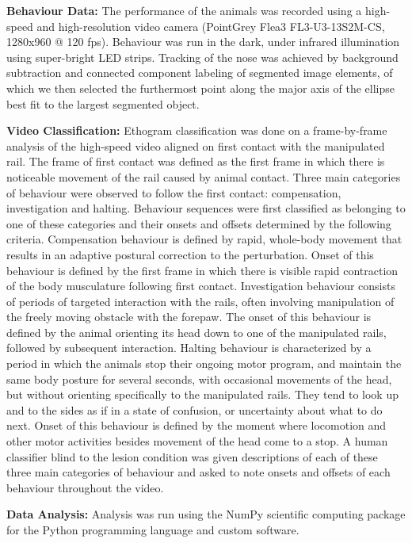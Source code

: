 \textbf{Behaviour Data:} The performance of the animals was recorded using a high-speed and high-resolution video camera (PointGrey Flea3 FL3-U3-13S2M-CS, 1280x960 @ 120 fps). Behaviour was run in the dark, under infrared illumination using super-bright LED strips. Tracking of the nose was achieved by background subtraction and connected component labeling of segmented image elements, of which we then selected the furthermost point along the major axis of the ellipse best fit to the largest segmented object.

\textbf{Video Classification:} Ethogram classification was done on a frame-by-frame analysis of the high-speed video aligned on first contact with the manipulated rail. The frame of first contact was defined as the first frame in which there is noticeable movement of the rail caused by animal contact. Three main categories of behaviour were observed to follow the first contact: compensation, investigation and halting. Behaviour sequences were first classified as belonging to one of these categories and their onsets and offsets determined by the following criteria. Compensation behaviour is defined by rapid, whole-body movement that results in an adaptive postural correction to the perturbation. Onset of this behaviour is defined by the first frame in which there is visible rapid contraction of the body musculature following first contact. Investigation behaviour consists of periods of targeted interaction with the rails, often involving manipulation of the freely moving obstacle with the forepaw. The onset of this behaviour is defined by the animal orienting its head down to one of the manipulated rails, followed by subsequent interaction. Halting behaviour is characterized by a period in which the animals stop their ongoing motor program, and maintain the same body posture for several seconds, with occasional movements of the head, but without orienting specifically to the manipulated rails. They tend to look up and to the sides as if in a state of confusion, or uncertainty about what to do next. Onset of this behaviour is defined by the moment where locomotion and other motor activities besides movement of the head come to a stop. A human classifier blind to the lesion condition was given descriptions of each of these three main categories of behaviour and asked to note onsets and offsets of each behaviour throughout the video.

\textbf{Data Analysis:} Analysis was run using the NumPy scientific computing package for the Python programming language and custom software.











